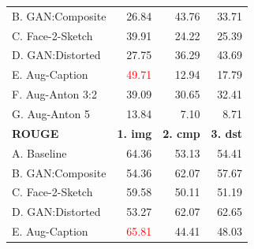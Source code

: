 \documentclass[aspectratio=1610]{beamer} %
\begin{document}
\begin{frame}
\begin{table}[htbp]
{\begin{tabular}{|l|rrr|}
B. GAN:Composite        & 26.84                                                    & 43.76                                               & 33.71                                                      \\
C. Face-2-Sketch       & 39.91                                                & 24.22                                                     & 25.39                                                      \\
D. GAN:Distorted         & 27.75                                                    & 36.29                                                     & 43.69
\\
\hdashline
E. Aug-Caption             & \textcolor{red}{49.71}                                                  & 12.94                                                     & 17.79                                                      \\
F. Aug-Anton 3:2 & 39.09                                                    & 30.65                                                & 32.41                                                 \\
G. Aug-Anton 5   & 13.84                                                    & 7.10                                                      & 8.71                                                       \\
\hline
\hline
\textbf{ROUGE} & \textbf{1. img} & \textbf{2. cmp} & \textbf{3. dst} \\ 
\hline
A. Baseline          & 64.36                                                  & 53.13                                                     & 54.41                                                      \\
B. GAN:Composite        & 54.36                                                    & 62.07                                                & 57.67                                                      \\
C. Face-2-Sketch       & 59.58                                                & 50.11                                                     & 51.19                                                      \\
D. GAN:Distorted         & 53.27                                                    & 62.07                                                     & 62.65                                                   \\
\hdashline
E. Aug-Caption             & \textcolor{red}{65.81}                                                & 44.41                                                     & 48.03                                                      \\

\end{tabular}}
\end{table}
\end{frame}
\end{document}

